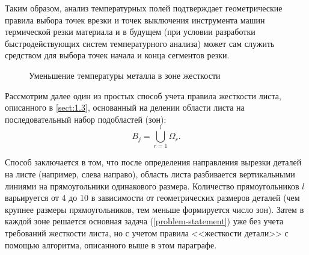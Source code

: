 \documentclass[11pt,twoside,openany]{report}
\newcounter{lem}
\begin{document}
Таким образом,
анализ температурных полей подтверждает
геометрические правила выбора точек врезки
и точек выключения инструмента машин термической
резки материала и в будущем
(при условии разработки быстродействующих систем температурного анализа)
может сам служить средством для выбора точек начала и конца сегментов резки.

\begin{figure}
  \centering
  \caption{Уменьшение температуры металла в зоне жесткости }
  \label{thermal-550-130}
\end{figure}

Рассмотрим далее один из простых способ учета правила жесткости листа,
описанного в \ref{sect:1.3},
основанный на делении области листа на
последовательный набор подобластей (зон):
$$
  B_j =
  \bigcup_{r=1}^l \Omega_r
  .
$$

Способ заключается в том,
что после определения направления вырезки деталей на листе
(например, слева направо),
область листа разбивается вертикальными линиями
на прямоугольники одинакового размера.
Количество прямоугольников $l$
варьируется от 4 до 10 в зависимости от
геометрических размеров деталей
(чем крупнее размеры прямоугольников,
тем меньше формируется число зон).
Затем в каждой зоне решается основная задача
(\ref{problem-statement})
уже без учета требований жесткости листа,
но с учетом правила <<жесткости детали>>
с помощью  алгоритма, описанного выше в этом параграфе.
\end{document}
